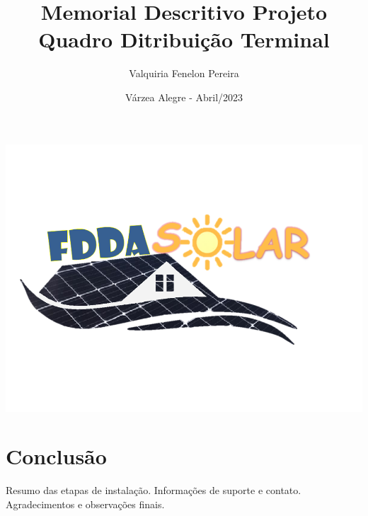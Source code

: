 \documentclass{article}
\title{Memorial Descritivo Projeto Quadro Ditribuição Terminal }
\author{Valquiria Fenelon Pereira}
\date{Várzea Alegre - Abril/2023}
\begin{document}
\thispagestyle{empty}

\includegraphics[scale=0.3]{logo20FddaSolar.png}


\maketitle



















\section{Conclusão}

Resumo das etapas de instalação. Informações de suporte e contato. Agradecimentos e observações finais.
\end{document}
